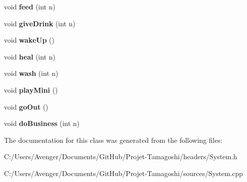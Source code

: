 \begin{DoxyCompactItemize}
\item 
\hypertarget{class_system_a57044c74ca958da37b727b953ead41e7}{void {\bfseries feed} (int n)}\label{class_system_a57044c74ca958da37b727b953ead41e7}

\item 
\hypertarget{class_system_a65e806e4d0aa912840087303b14b5c98}{void {\bfseries give\+Drink} (int n)}\label{class_system_a65e806e4d0aa912840087303b14b5c98}

\item 
\hypertarget{class_system_ae483237be5c5b2a0350ec86bc39d4cac}{void {\bfseries wake\+Up} ()}\label{class_system_ae483237be5c5b2a0350ec86bc39d4cac}

\item 
\hypertarget{class_system_a2b6b228f1e2c91b9063a76466010032f}{void {\bfseries heal} (int n)}\label{class_system_a2b6b228f1e2c91b9063a76466010032f}

\item 
\hypertarget{class_system_a915e94600a9528233ad97f0f3e8912b7}{void {\bfseries wash} (int n)}\label{class_system_a915e94600a9528233ad97f0f3e8912b7}

\item 
\hypertarget{class_system_a9df531e150c4e567241c42efe222c5e5}{void {\bfseries play\+Mini} ()}\label{class_system_a9df531e150c4e567241c42efe222c5e5}

\item 
\hypertarget{class_system_a2d751068c954d445feeeb19b2199680d}{void {\bfseries go\+Out} ()}\label{class_system_a2d751068c954d445feeeb19b2199680d}

\item 
\hypertarget{class_system_a2c54dee71c478b1a0aeb05302f6374b3}{void {\bfseries do\+Business} (int n)}\label{class_system_a2c54dee71c478b1a0aeb05302f6374b3}

\end{DoxyCompactItemize}


The documentation for this class was generated from the following files\+:\begin{DoxyCompactItemize}
\item 
C\+:/\+Users/\+Avenger/\+Documents/\+Git\+Hub/\+Projet-\/\+Tamagoshi/headers/System.\+h\item 
C\+:/\+Users/\+Avenger/\+Documents/\+Git\+Hub/\+Projet-\/\+Tamagoshi/sources/System.\+cpp\end{DoxyCompactItemize}

